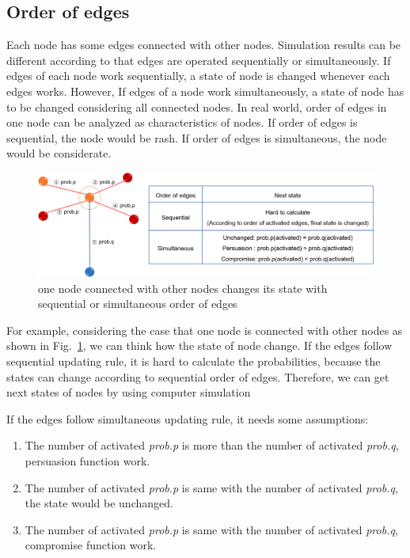 \subsection{Order of edges}
Each node has some edges connected with other nodes. Simulation results can be different according to that edges are operated sequentially or simultaneously. If edges of each node work sequentially, a state of node is changed whenever each edges works. However, If edges of a node work simultaneously, a state of node has to be changed considering all connected nodes. In real world, order of edges in one node can be analyzed as characteristics of nodes. If order of edges is sequential, the node would be rash. If order of edges is simultaneous, the node would be considerate. 
\begin{figure}[!htb]
	\centering
	\includegraphics[width=\hsize]{figure/edgeorder_explanation.png}
	\caption{one node connected with other nodes changes its state with sequential or simultaneous order of edges}
	\label{edgeorder_explanation}
\end{figure}  
For example, considering the case that one node is connected with other nodes as shown in Fig.~\ref{edgeorder_explanation}, we can think how the state of node change. 
If the edges follow sequential updating rule, it is hard to calculate the probabilities, because the states can change according to sequential order of edges. Therefore, we can get next states of nodes by using computer simulation 

If the edges follow simultaneous updating rule, it needs some assumptions: 
\begin{enumerate}[(1)]
	\item The number of activated \textit{prob.p} is more than the number of activated \textit{prob.q}, persuasion function work. 
	\item The number of activated \textit{prob.p} is same with the number of activated \textit{prob.q}, the state would be unchanged.
	\item The number of activated \textit{prob.p} is same with the number of activated \textit{prob.q}, compromise function work.
\end{enumerate}


